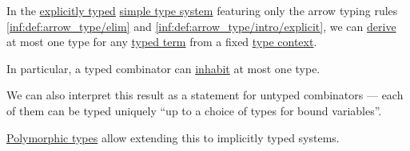 \begin{proposition}\label{thm:typed_term_habitation_uniqueness}
  In the \hyperref[def:simple_type_system_style]{explicitly typed} \hyperref[def:simple_type_system]{simple type system} featuring only the arrow typing rules \ref{inf:def:arrow_type/elim} and \ref{inf:def:arrow_type/intro/explicit}, we can \hyperref[def:simple_type_derivability]{derive} at most one type for any \hyperref[def:typed_lambda_term]{typed term} from a fixed \hyperref[def:type_context]{type context}.
\end{proposition}
\begin{comments}
  \item In particular, a typed combinator can \hyperref[def:type_habitation]{inhabit} at most one type.

  \item We can also interpret this result as a statement for untyped combinators --- each of them can be typed uniquely \enquote{up to a choice of types for bound variables}.

  \item \hyperref[def:lambda_cube/term_on_type]{Polymorphic types} allow extending this to implicitly typed systems.
\end{comments}
